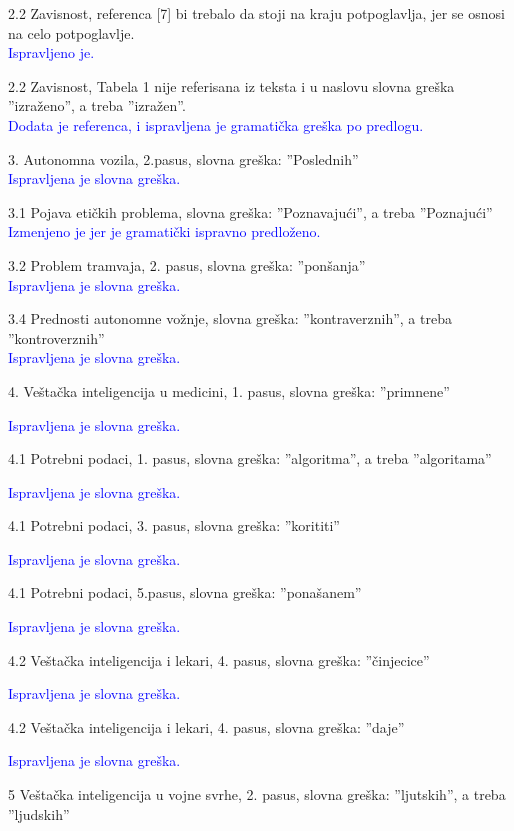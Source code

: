 \documentclass[a4paper]{report}
\newcommand{\odgovor}[1]{\textcolor{blue}{#1}}
\begin{document}
2.2 Zavisnost, referenca [7] bi trebalo da stoji na kraju potpoglavlja, jer se osnosi na celo potpoglavlje. \\
\odgovor{Ispravljeno je.}

2.2 Zavisnost, Tabela 1 nije referisana iz teksta i u naslovu slovna greška ''izraženo'', a treba ''izražen''. \\
\odgovor{Dodata je referenca, i ispravljena je gramatička greška po predlogu.}

3. Autonomna vozila, 2.pasus, slovna greška: ''Poslednih'' \\
\odgovor{Ispravljena je slovna greška.}

3.1 Pojava etičkih problema, slovna greška: ''Poznavajući'', a treba ''Poznajući'' \\
\odgovor{Izmenjeno je jer je gramatički ispravno predloženo.}

3.2 Problem tramvaja, 2. pasus, slovna greška: ''ponšanja'' \\
\odgovor{Ispravljena je slovna greška.}

3.4 Prednosti autonomne vožnje, slovna greška: ''kontraverznih'', a treba ''kontroverznih'' \\
\odgovor{Ispravljena je slovna greška.}

4. Veštačka inteligencija u medicini, 1. pasus, slovna greška: ''primnene''

\odgovor{Ispravljena je slovna greška.}

4.1 Potrebni podaci, 1. pasus, slovna greška: ''algoritma'', a treba ''algoritama''

\odgovor{Ispravljena je slovna greška.}

4.1 Potrebni podaci, 3. pasus, slovna greška: ''korititi''

\odgovor{Ispravljena je slovna greška.}

4.1 Potrebni podaci, 5.pasus, slovna greška: ''ponašanem''

\odgovor{Ispravljena je slovna greška.}

4.2 Veštačka inteligencija i lekari, 4. pasus, slovna greška: ''činjecice''

\odgovor{Ispravljena je slovna greška.}

4.2 Veštačka inteligencija i lekari, 4. pasus, slovna greška: ''daje''

\odgovor{Ispravljena je slovna greška.}

5 Veštačka inteligencija u vojne svrhe, 2. pasus, slovna greška: ''ljutskih'', a treba ''ljudskih''
\end{document}
